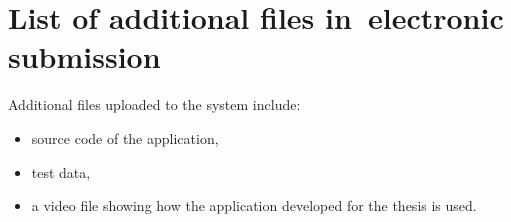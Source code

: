 \chapter{List of additional files in~electronic submission}


Additional files uploaded to the system include:
\begin{itemize}
\item source code of the application,
\item test data,
\item a video file showing how the application developed for the thesis is used.
\end{itemize}
